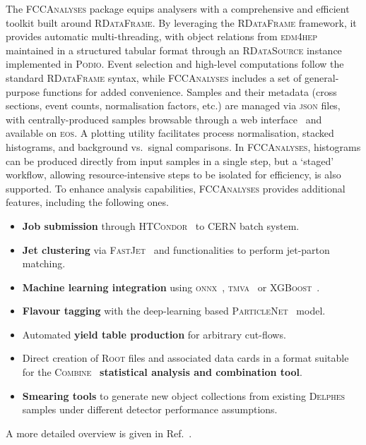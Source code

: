 The \textsc{FCCAnalyses} package equips analysers with a comprehensive and efficient toolkit built around \textsc{RDataFrame}. 
By leveraging the \textsc{RDataFrame} framework, it provides automatic multi-threading, 
with object relations from \textsc{edm4hep} maintained in a structured tabular format 
through an \textsc{RDataSource} instance implemented in \textsc{Podio}. 
Event selection and high-level computations follow the standard \textsc{RDataFrame} syntax, 
while \textsc{FCCAnalyses} includes a set of general-purpose functions for added convenience. 
Samples and their metadata (cross sections, event counts, normalisation factors, etc.) are managed via \textsc{json} files, 
with centrally-produced samples browsable through a web interface~\cite{samplesWebPage} and available on \textsc{eos}. 
A plotting utility facilitates process normalisation, stacked histograms, and background vs.\ signal comparisons. 
In \textsc{FCCAnalyses}, histograms can be produced directly from input samples in a single step, but a `staged' workflow, 
allowing resource-intensive steps to be isolated for efficiency, is also supported. 
To enhance analysis capabilities, \textsc{FCCAnalyses} provides additional features, including the following ones.

\begin{itemize}
\item \textbf{Job submission} through \textsc{HTCondor}~\cite{htcondor} to CERN batch system.
\item \textbf{Jet clustering} via \textsc{FastJet}~\cite{fastjet} and functionalities to perform jet-parton matching.
\item \textbf{Machine learning integration} using \textsc{onnx~\cite{onnx}}, \textsc{tmva}~\cite{tmva} or \textsc{XGBoost}~\cite{xgboost}.
\item \textbf{Flavour tagging} with the deep-learning based \textsc{ParticleNet}~\cite{particlenet} model.
\item Automated \textbf{yield table production} for arbitrary cut-flows. 
\item Direct creation of \textsc{Root} files and associated data cards 
in a format suitable for the \textsc{Combine}~\cite{combine} \textbf{statistical analysis and combination tool}.
\item \textbf{Smearing tools} to generate new object collections from existing \textsc{Delphes} samples 
under different detector performance assumptions.
\end{itemize}
A more detailed overview is given in Ref.~\cite{softwareNote}.

